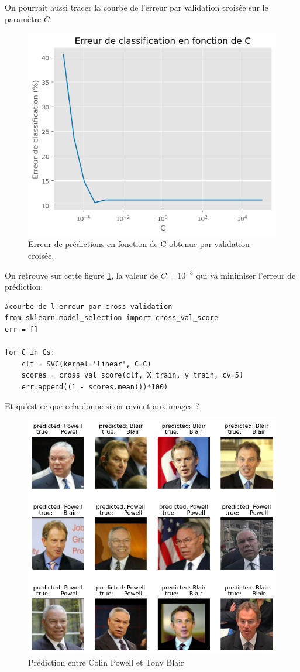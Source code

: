 \documentclass[10pt,a4paper]{article}
\begin{document}
\medskip

On pourrait aussi tracer la courbe de l'erreur par validation croisée sur le paramètre $C$.  

\begin{figure}[H]
\centerline{\includegraphics[width=0.65\linewidth]{images/erreur_C.png}}
\caption{Erreur de prédictions en fonction de C obtenue par validation croisée.}
\label{fig:err_C}
\end{figure}

On retrouve sur cette figure \ref{fig:err_C}, la valeur de $C=10^{-3}$ qui va minimiser l'erreur de prédiction.

\begin{lstlisting}
#courbe de l'erreur par cross validation
from sklearn.model_selection import cross_val_score
err = []

for C in Cs:
    clf = SVC(kernel='linear', C=C)
    scores = cross_val_score(clf, X_train, y_train, cv=5)
    err.append((1 - scores.mean())*100)
\end{lstlisting}

\newpage

Et qu'est ce que cela donne si on revient aux images ? 

\begin{figure}[H]
\centerline{\includegraphics[width=0.8\linewidth]{images/pred_blair_powell.png}}
\caption{Prédiction entre Colin Powell et Tony Blair}
\label{fig:pow_blair}
\end{figure}
\end{document}
